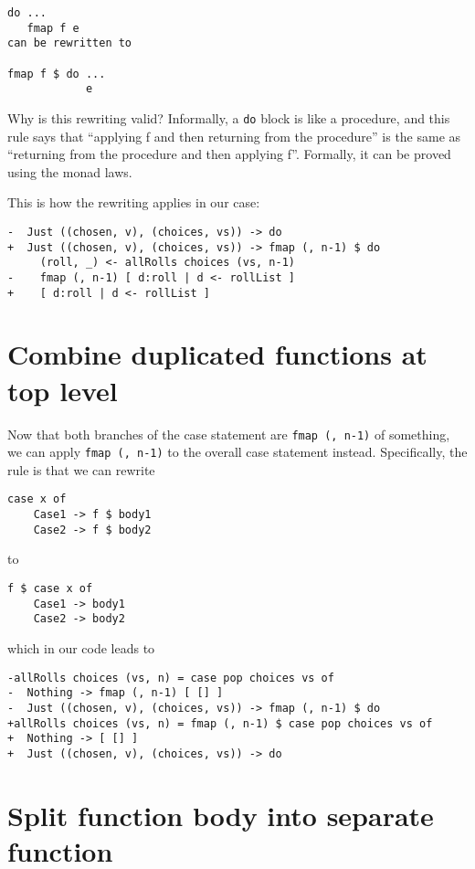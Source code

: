 \begin{verbatim}
do ...
   fmap f e
can be rewritten to

fmap f $ do ...
            e
\end{verbatim}
Why is this rewriting valid? Informally, a \texttt{do} block is like a procedure, and this rule says that ``applying f and then returning from the procedure'' is the same as ``returning from the procedure and then applying f''. Formally, it can be proved using the monad laws.

This is how the rewriting applies in our case:

\begin{verbatim}
-  Just ((chosen, v), (choices, vs)) -> do
+  Just ((chosen, v), (choices, vs)) -> fmap (, n-1) $ do
     (roll, _) <- allRolls choices (vs, n-1)
-    fmap (, n-1) [ d:roll | d <- rollList ]
+    [ d:roll | d <- rollList ]
\end{verbatim}

\section{Combine duplicated functions at top level}


Now that both branches of the case statement are \texttt{fmap (, n-1)} of something, we can apply \texttt{fmap (, n-1)} to the overall case statement instead. Specifically, the rule is that we can rewrite

\begin{verbatim}
case x of
    Case1 -> f $ body1
    Case2 -> f $ body2
\end{verbatim}
to

\begin{verbatim}
f $ case x of
    Case1 -> body1
    Case2 -> body2
\end{verbatim}
which in our code leads to

\begin{verbatim}
-allRolls choices (vs, n) = case pop choices vs of
-  Nothing -> fmap (, n-1) [ [] ]
-  Just ((chosen, v), (choices, vs)) -> fmap (, n-1) $ do
+allRolls choices (vs, n) = fmap (, n-1) $ case pop choices vs of
+  Nothing -> [ [] ]
+  Just ((chosen, v), (choices, vs)) -> do
\end{verbatim}


\section{Split function body into separate function}


